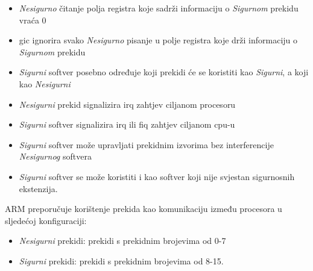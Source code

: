 \documentclass[times, utf8, diplomski, numeric]{fer}
\begin{document}
\begin{itemize}
  \item{\textit{Nesigurno} čitanje polja registra koje sadrži informaciju o \textit{Sigurnom} prekidu vraća 0}
  \item{\gls{gic} ignorira svako \textit{Nesigurno} pisanje u polje registra koje drži informaciju o \textit{Sigurnom} prekidu}
  \item{\textit{Sigurni} softver posebno određuje koji prekidi će se koristiti kao \textit{Sigurni}, a koji kao \textit{Nesigurni}}
  \item{\textit{Nesigurni} prekid signalizira \gls{irq} zahtjev ciljanom procesoru}
  \item{\textit{Sigurni} softver signalizira \gls{irq} ili \gls{fiq} zahtjev ciljanom \gls{cpu}-u}
  \item{\textit{Sigurni} softver može upravljati prekidnim izvorima bez interferencije \textit{Nesigurnog} softvera}
  \item{\textit{Sigurni} softver se može koristiti i kao softver koji nije svjestan sigurnosnih ekstenzija.}
\end{itemize}
ARM preporučuje korištenje prekida kao komunikaciju između procesora u sljedećoj konfiguraciji:
\begin{itemize}
  \item{\textit{Nesigurni} prekidi: prekidi s prekidnim brojevima od 0-7}
  \item{\textit{Sigurni} prekidi: prekidi s prekidnim brojevima od 8-15.}
\end{itemize}
\end{document}
